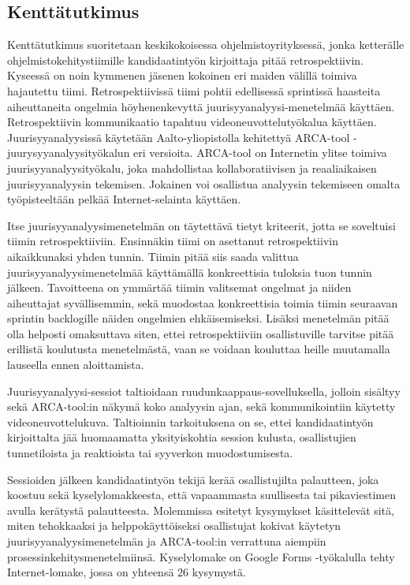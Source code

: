 \subsection{Kenttätutkimus}
Kenttätutkimus suoritetaan keskikokoisessa ohjelmistoyrityksessä, jonka ketterälle ohjelmistokehitystiimille kandidaatintyön kirjoittaja pitää retrospektiivin. Kyseessä on noin kymmenen jäsenen kokoinen eri maiden välillä toimiva hajautettu tiimi. Retrospektiivissä tiimi pohtii edellisessä sprintissä haasteita aiheuttaneita ongelmia höyhenenkevyttä juurisyyanalyysi-menetelmää käyttäen. Retrospektiivin kommunikaatio tapahtuu videoneuvottelutyökalua käyttäen. Juurisyyanalyysissä käytetään Aalto-yliopistolla kehitettyä ARCA-tool -juurysyyanalyysityökalun eri versioita. ARCA-tool on Internetin ylitse toimiva juurisyyanalyysityökalu, joka mahdollistaa kollaboratiivisen ja reaaliaikaisen juurisyyanalyysin tekemisen. Jokainen voi osallistua analyysin tekemiseen omalta työpisteeltään pelkää Internet-selainta käyttäen.

Itse juurisyyanalyysimenetelmän on täytettävä tietyt kriteerit, jotta se soveltuisi tiimin retrospektiiviin. Ensinnäkin tiimi on asettanut retrospektiivin aikaikkunaksi yhden tunnin. Tiimin pitää siis saada valittua juurisyyanalyysimenetelmää käyttämällä konkreettisia tuloksia tuon tunnin jälkeen. Tavoitteena on ymmärtää tiimin valitsemat ongelmat ja niiden aiheuttajat syvällisemmin, sekä muodostaa konkreettisia toimia tiimin seuraavan sprintin backlogille näiden ongelmien ehkäisemiseksi. Lisäksi menetelmän pitää olla helposti omaksuttava siten, ettei retrospektiiviin osallistuville tarvitse pitää erillistä koulutusta menetelmästä, vaan se voidaan kouluttaa heille muutamalla lauseella ennen aloittamista.

Juurisyyanalyysi-sessiot taltioidaan ruudunkaappaus-sovelluksella, jolloin sisältyy sekä ARCA-tool:in näkymä koko analyysin ajan, sekä kommunikointiin käytetty videoneuvottelukuva. Taltioinnin tarkoituksena on se, ettei kandidaatintyön kirjoittalta jää huomaamatta yksityiskohtia session kulusta, osallistujien tunnetiloista ja reaktioista tai syyverkon muodostumisesta.

Sessioiden jälkeen kandidaatintyön tekijä kerää osallistujilta palautteen, joka koostuu sekä kyselylomakkeesta, että vapaammasta suullisesta tai pikaviestimen avulla kerätystä palautteesta. Molemmissa esitetyt kysymykset käsittelevät sitä, miten tehokkaaksi ja helppokäyttöiseksi osallistujat kokivat käytetyn juurisyyanalyysimenetelmän ja ARCA-tool:in verrattuna aiempiin prosessinkehitysmenetelmiinsä. Kyselylomake on Google Forms -työkalulla tehty Internet-lomake, jossa on yhteensä 26 kysymystä. 

